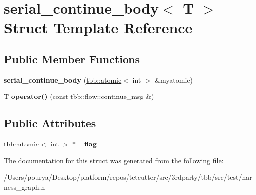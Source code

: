 \hypertarget{structserial__continue__body}{}\section{serial\+\_\+continue\+\_\+body$<$ T $>$ Struct Template Reference}
\label{structserial__continue__body}
\subsection*{Public Member Functions}
\begin{DoxyCompactItemize}
\item 
\hypertarget{structserial__continue__body_a5c16c3cb4e30318455f72bdca904e31d}{}{\bfseries serial\+\_\+continue\+\_\+body} (\hyperlink{structtbb_1_1atomic}{tbb\+::atomic}$<$ int $>$ \&myatomic)\label{structserial__continue__body_a5c16c3cb4e30318455f72bdca904e31d}

\item 
\hypertarget{structserial__continue__body_a70083712f1f3564f9d16bcda8d10c6de}{}T {\bfseries operator()} (const tbb\+::flow\+::continue\+\_\+msg \&)\label{structserial__continue__body_a70083712f1f3564f9d16bcda8d10c6de}

\end{DoxyCompactItemize}
\subsection*{Public Attributes}
\begin{DoxyCompactItemize}
\item 
\hypertarget{structserial__continue__body_a80bb65a698fa043c20e2f77d0fe9a041}{}\hyperlink{structtbb_1_1atomic}{tbb\+::atomic}$<$ int $>$ $\ast$ {\bfseries \+\_\+flag}\label{structserial__continue__body_a80bb65a698fa043c20e2f77d0fe9a041}

\end{DoxyCompactItemize}


The documentation for this struct was generated from the following file\+:\begin{DoxyCompactItemize}
\item 
/\+Users/pourya/\+Desktop/platform/repos/tetcutter/src/3rdparty/tbb/src/test/harness\+\_\+graph.\+h\end{DoxyCompactItemize}
